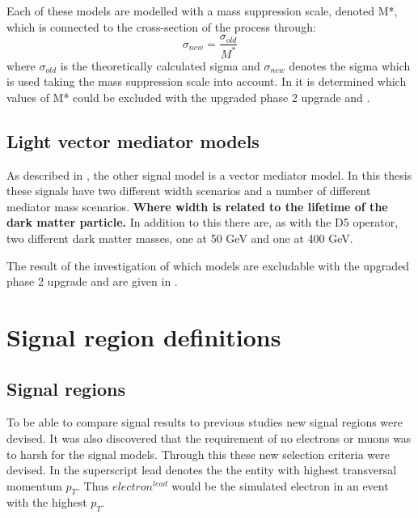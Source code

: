 Each of these models are modelled with a mass suppression scale, denoted M*, which is connected to the cross-section of the process through:
\begin{equation}
\sigma_{new} = \frac{\sigma_{old}}{M^*} 
\end{equation}
where $\sigma_{old}$ is the theoretically calculated sigma and $\sigma_{new}$ denotes the sigma which is used taking the mass suppression scale into account.
In  it is determined which values of M* could be excluded with the upgraded \abbrLHC phase 2 upgrade and \abbrATLAS .

\subsection{Light vector mediator models}\label{sec:signal:subsec:vecmed}
As described in , the other signal model is a vector mediator model. In this thesis these signals have two different width scenarios and a number of different mediator mass scenarios. \textbf{Where width is related to the lifetime of the dark matter particle.} In addition to this there are, as with the D5 operator, two different dark matter masses, one at 50 GeV and one at 400 GeV.

The result of the investigation of which models are excludable with the upgraded \abbrLHC phase 2 upgrade and \abbrATLAS are given in . 
 
\newpage
\section{Signal region definitions}
\subsection{Signal regions}
To be able to compare signal results to previous studies new signal regions were devised. It was also discovered that the requirement of no electrons or muons was to harsh for the signal models. Through this these new selection criteria were devised. In  the superscript lead denotes the the entity with highest transversal momentum $p_T$. Thus $electron^{lead}$ would be the simulated electron in an event with the highest $p_T$.

